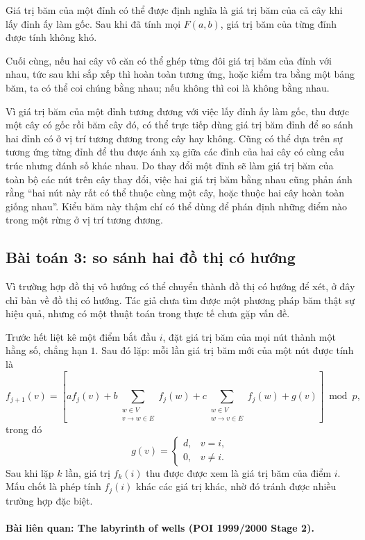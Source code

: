 \documentclass[11pt]{article}
\begin{document}
Giá trị băm của một đỉnh có thể được định nghĩa là giá trị băm của cả cây khi
lấy đỉnh ấy làm gốc. Sau khi đã tính mọi $F(a,b)$, giá trị băm của từng đỉnh
được tính không khó.

Cuối cùng, nếu hai cây vô căn có thể ghép từng đôi giá trị băm của đỉnh với
nhau, tức sau khi sắp xếp thì hoàn toàn tương ứng, hoặc kiểm tra bằng một
bảng băm, ta có thể coi chúng bằng nhau; nếu không thì coi là không bằng
nhau.

Vì giá trị băm của một đỉnh tương đương với việc lấy đỉnh ấy làm gốc, thu
được một cây có gốc rồi băm cây đó, có thể trực tiếp dùng giá trị băm đỉnh để
so sánh hai đỉnh có ở vị trí tương đương trong cây hay không. Cũng có thể
dựa trên sự tương ứng từng đỉnh để thu được ánh xạ giữa các đỉnh của hai cây
có cùng cấu trúc nhưng đánh số khác nhau. Do thay đổi một đỉnh sẽ làm giá trị
băm của toàn bộ các nút trên cây thay đổi, việc hai giá trị băm bằng nhau
cũng phản ánh rằng ``hai nút này rất có thể thuộc cùng một cây, hoặc thuộc
hai cây hoàn toàn giống nhau''. Kiểu băm này thậm chí có thể dùng để phán
định những điểm nào trong một rừng ở vị trí tương đương.

\subsection{Bài toán 3: so sánh hai đồ thị có hướng}

Vì trường hợp đồ thị vô hướng có thể chuyển thành đồ thị có hướng để xét, ở
đây chỉ bàn về đồ thị có hướng. Tác giả chưa tìm được một phương pháp băm
thật sự hiệu quả, nhưng có một thuật toán trong thực tế chưa gặp vấn đề.

Trước hết liệt kê một điểm bắt đầu $i$, đặt giá trị băm của mọi nút thành một
hằng số, chẳng hạn $1$. Sau đó lặp: mỗi lần giá trị băm mới của một nút được
tính là
\[
  f_{j+1}(v)=
  \left[
    a f_j(v)
    +b\sum_{\substack{w\in V\\ v\to w\in E}} f_j(w)
    +c\sum_{\substack{w\in V\\ w\to v\in E}} f_j(w)
    +g(v)
  \right]\bmod p,
\]
trong đó
\[
  g(v)=
  \begin{cases}
    d, & v=i,\\
    0, & v\ne i.
  \end{cases}
\]
Sau khi lặp $k$ lần, giá trị $f_k(i)$ thu được được xem là giá trị băm của
điểm $i$. Mấu chốt là phép tính $f_j(i)$ khác các giá trị khác, nhờ đó tránh
được nhiều trường hợp đặc biệt.

\paragraph{Bài liên quan: The labyrinth of wells (POI 1999/2000 Stage 2).}
\end{document}
